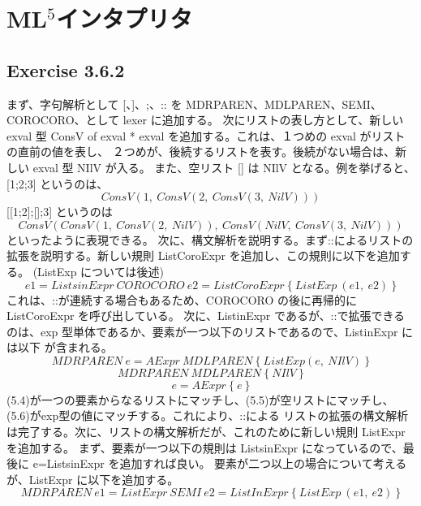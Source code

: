 \documentclass{jreport}
\begin{document}
	\chapter{ML$^5$インタプリタ}
		\section{Exercise 3.6.2}
			まず、字句解析として [、]、;、:: を MDRPAREN、MDLPAREN、SEMI、COROCORO、として lexer に追加する。
			次にリストの表し方として、新しい exval 型 ConsV of exval * exval を追加する。これは、１つめの exval がリストの直前の値を表し、
			２つめが、後続するリストを表す。後続がない場合は、新しい exval 型 NIlV が入る。
			また、空リスト [] は NIlV となる。例を挙げると、[1;2;3] というのは、
\begin{equation}ConsV(1, \ ConsV(2, \ ConsV(3, \ NilV)))\end{equation}
			[[1;2];[];3] というのは
\begin{equation}ConsV(ConsV(1, \ ConsV(2, \ NilV)), \ ConsV(NilV, \ ConsV(3, \ NilV)))\end{equation}
			といったように表現できる。
			次に、構文解析を説明する。まず::によるリストの拡張を説明する。新しい規則 ListCoroExpr を追加し、この規則に以下を追加する。
			(ListExp については後述)
\begin{equation}e1=ListsinExpr \ COROCORO \ e2=ListCoroExpr \ \{ \ ListExp \ (e1, \ e2) \ \}\end{equation}
			これは、::が連続する場合もあるため、COROCORO の後に再帰的に ListCoroExpr を呼び出している。
			次に、ListinExpr であるが、::で拡張できるのは、exp 型単体であるか、要素が一つ以下のリストであるので、ListinExpr には以下
			が含まれる。
\begin{equation}MDRPAREN \ e=AExpr \ MDLPAREN \ \{ \ ListExp(e, \ NIlV) \ \}\end{equation}
\begin{equation}MDRPAREN \ MDLPAREN \ \{ \ NIlV \ \}\end{equation}
\begin{equation}e=AExpr \ \{ \ e \ \}\end{equation}
			(5.4)が一つの要素からなるリストにマッチし、(5.5)が空リストにマッチし、(5.6)がexp型の値にマッチする。これにより、::による
			リストの拡張の構文解析は完了する。次に、リストの構文解析だが、これのために新しい規則 ListExpr を追加する。
			まず、要素が一つ以下の規則は ListsinExpr になっているので、最後に e=ListsinExpr を追加すれば良い。
			要素が二つ以上の場合について考えるが、ListExpr に以下を追加する。
\begin{equation}MDRPAREN \ e1=ListExpr \ SEMI \ e2=ListInExpr \ \{ \ ListExp \ (e1, \ e2) \ \}\end{equation}
\end{document}
